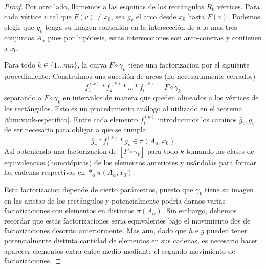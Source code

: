 \begin{proof}
  Por otro lado, llamemos a las esquinas de los rectángulos \(R_k\)
  vértices. Para cada vértice \(v\) tal que \(F (v) \neq x_0\), sea
  \(g_v\) el arco desde \(x_0\) hasta \(F(v)\). Podemos elegir que
  \(g_v\) tenga su imagen contenida en la intersección de a lo mas tres
  conjuntos \(A_\alpha\) pues por hipótesis, estas intersecciones son
  arco-conexas y contienen a \(x_0\).

  Para todo \(k \in \{1 \dots mn\}\), la curva \(F \circ \gamma_k\)
  tiene una factorizacion por el siguiente procedimiento: Construimos
  una sucesión de arcos (no necesariamente cerrados)
  \[ f_1^{(k)} * f_2^{(k)} * ... * f_l^{(k)} = F \circ \gamma_k \]
  separando a \(F \circ \gamma_k\) en intervalos de manera que queden
  alineados a los vértices de los rectángulos. Esto es un
  procedimiento análogo al utilizado en el teorema
  \ref{thm:vank-especifico}. Entre cada elemento \(f_i^{(k)}\)
  introducimos los caminos \(\bar g _v , g_v\) de ser necesario para
  obligar a que se cumpla
  \[\bar g _v * f_i^{(k)} * g_v \in \pi (A_\alpha, x_0)\]
  Así obteniendo una factorizacion de \([F \circ \gamma_k]\) para todo
  \(k\) tomando las clases de equivalencias (homotópicas) de los
  elementos anteriores y usándolas para formar las cadenas respectivas
  en \(*_\alpha \pi (A_\alpha, x_0)\).

  Esta factorizacion depende de cierto parámetros, puesto que \(\gamma_k\)
  tiene su imagen en las aristas de los rectángulos y potencialmente
  podría darnos varias factorizaciones con elementos en distintos \(\pi
  (A_\alpha)\). Sin embargo, debemos recordar que estas factorizaciones
  seria equivalentes bajo el movimiento dos de factorizaciones descrito
  anteriormente. Mas aun, dado que \(h\) e \(g\) pueden tener
  potencialmente distinta cantidad de elementos en sus cadenas, es
  necesario hacer aparecer elementos extra entre medio mediante el
  segundo movimiento de factorizaciones.


\end{proof}
